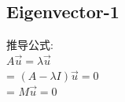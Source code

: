 \documentclass[12pt]{article}
\begin{document}
\subsection*{Eigenvector-1}
\begin{flushleft}
推导公式: \\
$A\vec{u} = \lambda\vec{u}$ \\
= 
$(A-\lambda I)\vec{u} =  0$ \\
= 
$M\vec{u} = 0$ \\













\end{flushleft}
\end{document}

